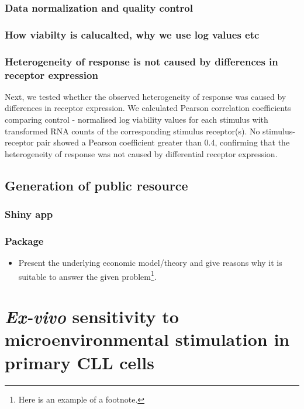 \documentclass[11pt, a4paper, twosided]{book}
\providecommand{\tightlist}{%
  \setlength{\itemsep}{0pt}\setlength{\parskip}{0pt}}
\begin{document}
\hypertarget{data-normalization-and-quality-control}{%
\subsection{Data normalization and quality control}\label{data-normalization-and-quality-control}}

\hypertarget{how-viabilty-is-calucalted-why-we-use-log-values-etc}{%
\subsection{How viabilty is calucalted, why we use log values etc}\label{how-viabilty-is-calucalted-why-we-use-log-values-etc}}

\hypertarget{heterogeneity-of-response-is-not-caused-by-differences-in-receptor-expression}{%
\subsection{Heterogeneity of response is not caused by differences in receptor expression}\label{heterogeneity-of-response-is-not-caused-by-differences-in-receptor-expression}}

Next, we tested whether the observed heterogeneity of response was caused by differences in receptor expression. We calculated Pearson correlation coefficients comparing control - normalised log viability values for each stimulus with transformed RNA counts of the corresponding stimulus receptor(s). No stimulus-receptor pair showed a Pearson coefficient greater than 0.4, confirming that the heterogeneity of response was not caused by differential receptor expression.



\hypertarget{generation-of-public-resource}{%
\section{Generation of public resource}\label{generation-of-public-resource}}

\hypertarget{shiny-app}{%
\subsection{Shiny app}\label{shiny-app}}

\hypertarget{package}{%
\subsection{Package}\label{package}}
\begin{itemize}
\tightlist
\item
  Present the underlying economic model/theory and give reasons why it is
  suitable to answer the given problem\footnote{Here is an example of a footnote.}.
\end{itemize}
\hypertarget{chapter4}{%
\chapter{\texorpdfstring{\emph{Ex-vivo} sensitivity to microenvironmental stimulation in primary CLL cells}{Ex-vivo sensitivity to microenvironmental stimulation in primary CLL cells}}\label{chapter4}}
\end{document}
